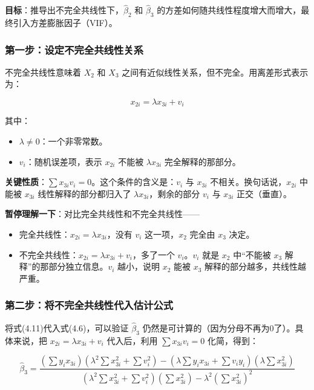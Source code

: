\documentclass[12pt,a4paper]{ctexart}
\begin{document}
\textbf{目标}：推导出不完全共线性下，$\hat{\beta}_2$ 和 $\hat{\beta}_3$ 的方差如何随共线性程度增大而增大，最终引入方差膨胀因子（VIF）。

\subsubsection{第一步：设定不完全共线性关系}

不完全共线性意味着 $X_2$ 和 $X_3$ 之间有近似线性关系，但不完全。用离差形式表示为：

\begin{equation}
x_{2i} = \lambda x_{3i} + v_i \tag{4.11}
\end{equation}

其中：
\begin{itemize}
    \item $\lambda \neq 0$：一个非零常数。
    \item $v_i$：随机误差项，表示 $x_{2i}$ 不能被 $\lambda x_{3i}$ 完全解释的那部分。
\end{itemize}

\textbf{关键性质}：$\sum x_{3i} v_i = 0$。这个条件的含义是：$v_i$ 与 $x_{3i}$ 不相关。换句话说，$x_{2i}$ 中能被 $x_{3i}$ 线性解释的部分都归入了 $\lambda x_{3i}$，剩余的部分 $v_i$ 与 $x_{3i}$ 正交（垂直）。

\textbf{暂停理解一下}：对比完全共线性和不完全共线性——
\begin{itemize}
    \item 完全共线性：$x_{2i} = \lambda x_{3i}$，没有 $v_i$ 这一项，$x_2$ 完全由 $x_3$ 决定。
    \item 不完全共线性：$x_{2i} = \lambda x_{3i} + v_i$，多了一个 $v_i$。$v_i$ 就是 $x_2$ 中“不能被 $x_3$ 解释”的那部分独立信息。$v_i$ 越小，说明 $x_2$ 能被 $x_3$ 解释的部分越多，共线性越严重。
\end{itemize}

\subsubsection{第二步：将不完全共线性代入估计公式}

将式(4.11)代入式(4.6)，可以验证 $\hat{\beta}_3$ 仍然是可计算的（因为分母不再为0了）。具体来说，把 $x_{2i} = \lambda x_{3i} + v_i$ 代入后，利用 $\sum x_{3i} v_i = 0$ 化简，得到：

\begin{equation}
\hat{\beta}_3 = \frac{(\sum y_i x_{3i})(\lambda^2 \sum x_{3i}^2 + \sum v_i^2) - (\lambda \sum y_i x_{3i} + \sum v_i y_i)(\lambda \sum x_{3i}^2)}{(\lambda^2 \sum x_{3i}^2 + \sum v_i^2)(\sum x_{3i}^2) - \lambda^2 (\sum x_{3i}^2)^2} \tag{4.12}
\end{equation}
\end{document}
